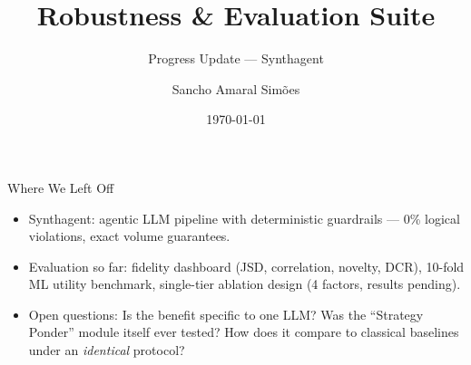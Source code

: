 \documentclass[aspectratio=169, 11pt]{beamer}
\title[Robustness Suite Update]{Robustness \& Evaluation Suite}
\subtitle{Progress Update --- Synthagent}
\author{Sancho Amaral Simões}
\date{\today}
\begin{document}
\begin{frame}
\titlepage
\end{frame}

\begin{frame}{Where We Left Off}
\begin{itemize}
\item Synthagent: agentic LLM pipeline with deterministic guardrails --- 0\% logical violations, exact volume guarantees.
\item Evaluation so far: fidelity dashboard (JSD, correlation, novelty, DCR), 10-fold ML utility benchmark, single-tier ablation design (4 factors, results pending).
\item \alert{Open questions}: Is the benefit specific to one LLM? Was the ``Strategy Ponder'' module itself ever tested? How does it compare to classical baselines under an \emph{identical} protocol?
\end{itemize}
\end{frame}
\end{document}
